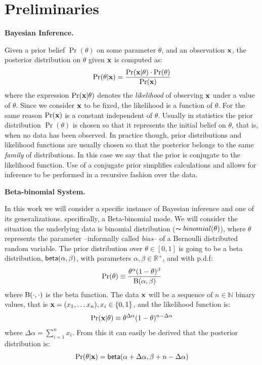 \documentclass{article}
\begin{document}
\section{Preliminaries}
\label{sec_background}

\noindent \textbf{Bayesian Inference.}

Given a prior belief $\Pr(\theta)$ on some parameter $\theta$,
and an observation $\textbf{x}$, the posterior distribution on $\theta$ given $\textbf{x}$ is computed as:
\[
  \Pr(\theta | \textbf{x}) = \frac{\Pr(\textbf{x} | \theta) \cdot \Pr(\theta)}{\Pr(\textbf{x})}
\]
where the expression $\Pr(\textbf{x} | \theta)$ denotes the
\emph{likelihood} of observing $\textbf{x}$ under a value of
$\theta$. Since we consider $\textbf{x}$ to be fixed, the likelihood is
a function of $\theta$.
For the same reason $\Pr(\textbf{x})$ is a constant independent of $\theta$.
Usually in statistics the prior distribution $\Pr(\theta)$ is chosen so that it represents
the initial belief on $\theta$, that is, when no data has been observed. In practice though,
prior distributions and likelihood functions are usually chosen so that the posterior
belongs to the same \emph{family} of distributions. In this case we say that the prior
is conjugate to the likelihood function. Use of a conjugate prior
simplifies calculations and allows for inference to be performed in a
recursive fashion over the data.


\noindent \textbf{Beta-binomial System.}

In this work we will consider a specific instance of Bayesian inference and one of its generalizations.
specifically, a Beta-binomial mode. We will consider the situation the underlying data is binomial distribution ($\thicksim binomial(\theta)$), where $\theta$ represents
the parameter --informally called \emph{bias}-- of a Bernoulli
distributed random variable. The
prior distribution over $\theta\in [0,1]$ is going to be a beta
distribution, $\mathsf{beta}(\alpha, \beta)$, with parameters
$\alpha,\beta\in\mathbb{R}^{+}$, and with p.d.f:
\[
  \Pr(\theta)\equiv \frac{\theta^{\alpha} (1- \theta)^{\beta}}{\textup{B}(\alpha,\beta)}
\]
where $\textup{B}(\cdot,\cdot)$ is the beta function.
The data $\textbf{x}$ will be a sequence of $n\in\mathbb{N}$ binary values, that is $\textbf{x}= (x_1,\dots x_n), x_i\in\{0,1\}$, and the likelihood function is:
\[
  \Pr(\textbf{x} | \theta)\equiv \theta^{\Delta \alpha}(1-\theta)^{n - \Delta \alpha}
\]
where $\Delta \alpha = \displaystyle\sum_{i=1}^{n}x_i$.
From this it can easily be derived that the posterior distribution is:
\[
  \Pr(\theta|\textbf{x})=\mathsf{beta}(\alpha + \Delta \alpha,\beta + n - \Delta \alpha)
\]
\end{document}
